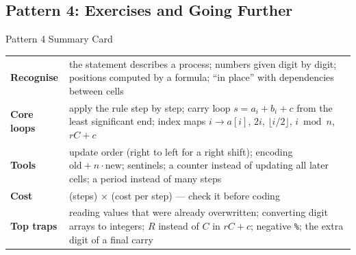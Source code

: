 \subsection{Pattern 4: Exercises and Going Further}
\label{ssec:ch1-p4-ex}

\begin{patternbox}{Pattern 4 Summary Card}
\begin{tabularx}{\linewidth}{@{}>{\bfseries}l X@{}}
Recognise & the statement describes a process; numbers given digit by digit; positions computed by a formula; ``in place'' with dependencies between cells \\
Core loops & apply the rule step by step; carry loop $s = a_i + b_i + c$ from the least significant end; index maps $i \to a[i]$, $2i$, $\lfloor i/2 \rfloor$, $i \bmod n$, $rC + c$ \\
Tools & update order (right to left for a right shift); encoding $\text{old} + n\cdot\text{new}$; sentinels; a counter instead of updating all later cells; a period instead of many steps \\
Cost & (steps) $\times$ (cost per step) --- check it before coding \\
Top traps & reading values that were already overwritten; converting digit arrays to integers; $R$ instead of $C$ in $rC + c$; negative \texttt{\%}; the extra digit of a final carry \\
\end{tabularx}
\end{patternbox}

